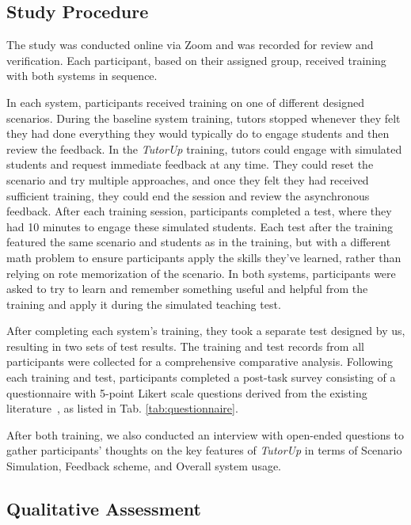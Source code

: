 \subsection{Study Procedure}

The study was conducted online via Zoom and was recorded for review and verification. Each participant, based on their assigned group, received training with both systems in sequence. 


In each system, participants received training on one of different designed scenarios. During the baseline system training, tutors stopped whenever they felt they had done everything they would typically do to engage students and then review the feedback. In the \textit{TutorUp} training, tutors could engage with simulated students and request immediate feedback at any time. They could reset the scenario and try multiple approaches, and once they felt they had received sufficient training, they could end the session and review the asynchronous feedback. After each training session, participants completed a test, where they had 10 minutes to engage these simulated students. Each test after the training featured the same scenario and students as in the training, but with a different math problem to ensure participants apply the skills they've learned, rather than relying on rote memorization of the scenario. In both systems, participants were asked to try to learn and remember something useful and helpful from the training and apply it during the simulated teaching test. 

After completing each system’s training, they took a separate test designed by us, resulting in two sets of test results. The training and test records from all participants were collected for a comprehensive comparative analysis. Following each training and test, participants completed a post-task survey consisting of a questionnaire with 5-point Likert scale questions derived from the existing literature~\cite{kirkpatrick1994, howcroft2020twenty}, as listed in Tab. \ref{tab:questionnaire}. 

After both training, we also conducted an interview with open-ended questions to gather participants' thoughts on the key features of \textit{TutorUp} in terms of Scenario Simulation, Feedback scheme, and Overall system usage.


\subsection{Qualitative Assessment}
\label{subsec:qualitative_assessment}

